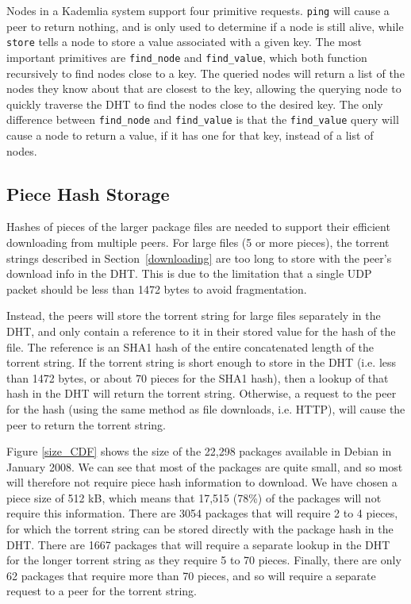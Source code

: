 \documentclass[conference]{IEEEtran}
\begin{document}
Nodes in a Kademlia system support four primitive requests.
\texttt{ping} will cause a peer to return nothing, and is only used
to determine if a node is still alive, while \texttt{store} tells a
node to store a value associated with a given key. The most
important primitives are \texttt{find\_node} and
\texttt{find\_value}, which both function recursively to find nodes
close to a key. The queried nodes will return a list of the nodes
they know about that are closest to the key, allowing the querying
node to quickly traverse the DHT to find the nodes close to the
desired key. The only difference between \texttt{find\_node} and \texttt{find\_value} is that the
\texttt{find\_value} query will cause a node to return a value, if
it has one for that key, instead of a list of nodes.

\subsection{Piece Hash Storage}
\label{pieces}

Hashes of pieces of the larger package files are needed to support
their efficient downloading from multiple peers.
For large files (5 or more pieces), the torrent strings described in
Section~\ref{downloading}
are too long to store with the peer's download info in the DHT. This
is due to the limitation that a single UDP packet should be less
than 1472 bytes to avoid fragmentation.

Instead, the peers will store the torrent string for large files
separately in the DHT, and only contain a reference to it in their
stored value for the hash of the file. The reference is an SHA1 hash
of the entire concatenated length of the torrent string. If the
torrent string is short enough to store in the DHT (i.e. less than
1472 bytes, or about 70 pieces for the SHA1 hash), then a lookup of
that hash in the DHT will return the torrent string. Otherwise, a
request to the peer for the hash (using the same method as file
downloads, i.e. HTTP), will cause the peer to return the torrent
string.

Figure \ref{size_CDF} shows the size of the 22,298 packages
available in Debian in January 2008. We can see that most of the
packages are quite small, and so most will therefore not require
piece hash information to download. We have chosen a piece
size of 512 kB, which means that 17,515 (78\%) of the packages will
not require this information. There are 3054 packages that will
require 2 to 4 pieces, for which the torrent string can be stored
directly with the package hash in the DHT. There are 1667 packages
that will require a separate lookup in the DHT for the longer
torrent string as they require 5 to 70 pieces. Finally, there are
only 62 packages that require more than 70 pieces, and so will
require a separate request to a peer for the torrent string.
\end{document}
